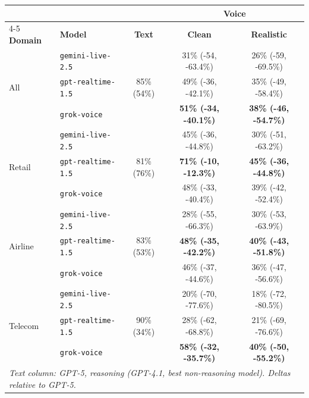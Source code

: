 \begin{tabular}{@{}llccc@{}}
\toprule
 &  &  & \multicolumn{2}{c}{\textbf{Voice}} \\
\cmidrule(l){4-5}
\textbf{Domain} & {\textbf{Model}} & \textbf{Text} & \textbf{Clean} & \textbf{Realistic} \\
\midrule
\multirow{3}{*}{All} & {\texttt{gemini-live-2.5}} & \multirow{3}{*}{85\% (54\%)} & 31\% (-54, -63.4\%) & 26\% (-59, -69.5\%) \\
 & {\texttt{gpt-realtime-1.5}} &  & 49\% (-36, -42.1\%) & 35\% (-49, -58.4\%) \\
 & {\texttt{grok-voice}} &  & \textbf{51\% (-34, -40.1\%)} & \textbf{38\% (-46, -54.7\%)} \\
\midrule
\multirow{3}{*}{Retail} & {\texttt{gemini-live-2.5}} & \multirow{3}{*}{81\% (76\%)} & 45\% (-36, -44.8\%) & 30\% (-51, -63.2\%) \\
 & {\texttt{gpt-realtime-1.5}} &  & \textbf{71\% (-10, -12.3\%)} & \textbf{45\% (-36, -44.8\%)} \\
 & {\texttt{grok-voice}} &  & 48\% (-33, -40.4\%) & 39\% (-42, -52.4\%) \\
\midrule
\multirow{3}{*}{Airline} & {\texttt{gemini-live-2.5}} & \multirow{3}{*}{83\% (53\%)} & 28\% (-55, -66.3\%) & 30\% (-53, -63.9\%) \\
 & {\texttt{gpt-realtime-1.5}} &  & \textbf{48\% (-35, -42.2\%)} & \textbf{40\% (-43, -51.8\%)} \\
 & {\texttt{grok-voice}} &  & 46\% (-37, -44.6\%) & 36\% (-47, -56.6\%) \\
\midrule
\multirow{3}{*}{Telecom} & {\texttt{gemini-live-2.5}} & \multirow{3}{*}{90\% (34\%)} & 20\% (-70, -77.6\%) & 18\% (-72, -80.5\%) \\
 & {\texttt{gpt-realtime-1.5}} &  & 28\% (-62, -68.8\%) & 21\% (-69, -76.6\%) \\
 & {\texttt{grok-voice}} &  & \textbf{58\% (-32, -35.7\%)} & \textbf{40\% (-50, -55.2\%)} \\
\bottomrule
\multicolumn{5}{l}{\footnotesize \textit{Text column: GPT-5, reasoning (GPT-4.1, best non-reasoning model). Deltas relative to GPT-5.}} \\
\end{tabular}